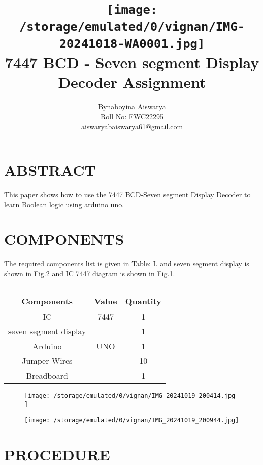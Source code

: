 \documentclass[conference]{IEEEtran}
\title{
\vspace{1cm}
{\texttt{[image:            /storage/emulated/0/vignan/IMG-20241018-WA0001.jpg]} \\ 7447 BCD - Seven segment Display Decoder Assignment} }
\author{Bynaboyina Aiswarya \\ Roll No: FWC22295 \\ aiswaryabaiswarya61@gmail.com}
\begin{document}
\maketitle
 \section {ABSTRACT}
 This paper shows how to use the 7447 BCD-Seven segment Display Decoder to learn Boolean logic using arduino uno.

\section{COMPONENTS}
The required components list is given in Table: I. and seven segment display is shown in Fig.2 and IC 7447 diagram is shown in Fig.1.
\vspace{0.3cm}
 \begin{table} [htbp]
\centering
\begin{tabular}{| c | c | c |} \hline
Components & Value & Quantity \\\hline
IC & 7447 & 1 \\ \hline
seven segment display & & 1\\ \hline
Arduino & UNO & 1 \\ \hline
Jumper Wires &  & 10 \\ \hline
Breadboard & & 1 \\ 
\hline
\end{tabular}
\vspace{0.3cm}
\caption{\label{tab:widgets}}
\end{table}

\begin{figure}[h]                           
\centering                            
\texttt{[image:  /storage/emulated/0/vignan/IMG\_20241019\_200414.jpg ]}                      
\caption{\label{fig-1:Gates}}           
\end{figure}

\begin{figure}[h]                           
\centering                                 
\texttt{[image:  /storage/emulated/0/vignan/IMG\_20241019\_200944.jpg]}                                           
\caption{\label{fig-2:Gates}}               
\end{figure}


\section{PROCEDURE}
\end{document}
